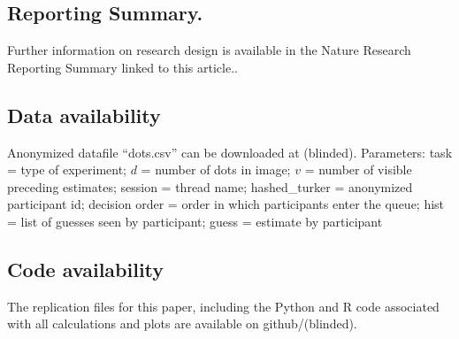 \documentclass[9pt,a4paper,twocolumn,lineno]{article}
\begin{document}
\subsection*{Reporting Summary.}\footnotesize Further information on research design is available in the Nature Research Reporting Summary linked to this article..

\subsection*{Data availability}\footnotesize Anonymized datafile ``dots.csv'' can be downloaded at (blinded). Parameters: task = type of experiment; $d$ = number of dots in image; $v$ = number of visible preceding estimates; session = thread name; hashed\_turker = anonymized participant id; decision order = order in which participants enter the queue; hist = list of guesses seen by participant; guess = estimate by participant

\subsection*{Code availability}\footnotesize The replication files for this paper, including the Python and R code associated with all calculations and plots are available on github/(blinded).




\setlength{\bibsep}{0.0pt}
%
%
\end{document}

